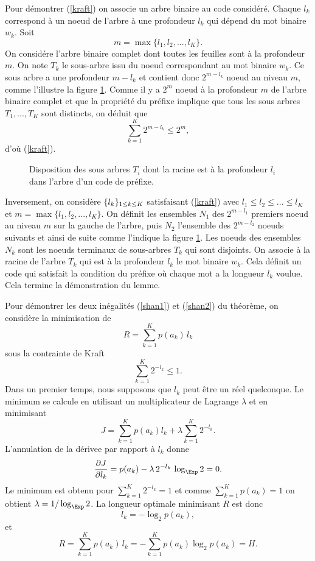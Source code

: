 Pour d\'emontrer (\ref{kraft}) on associe un arbre binaire
au code consid\'er\'e. Chaque $l_k$ correspond \`a un noeud
de l'arbre \`a une profondeur $l_k$ qui d\'epend du mot
binaire $w_k$. Soit
\begin{equation}
\label{mmax}
m = \max \{l_1, l_2, ... , l_K\} .
\end{equation}
On consid\'ere l'arbre binaire complet dont toutes les
feuilles sont \`a la profondeur $m$.
On note $T_k$ le sous-arbre issu du noeud correspondant au
mot binaire $w_k$. Ce sous arbre a une profondeur ${m - l_k}$
et contient donc $2^{m - l_k}$ noeud au niveau $m$, comme 
l'illustre la figure \ref{kraft-fig}. 
Comme il y a $2^m$ noeud \`a la profondeur $m$ de l'arbre binaire
complet et que
la propri\'et\'e du pr\'efixe implique
que tous les sous arbres $T_1 , ... , T_K$ sont distincts, on
d\'eduit que
\[
\sum_{k=1}^K 2^{m-l_k} \leq 2^m ,
\]
d'o\`u (\ref{kraft}).

\begin{figure}[bhtp]
\centerline{
	\epsfxsize=6cm
	\leavevmode{}}
\caption{Disposition des sous arbres $T_i$ dont la racine est \`a la
profondeur $l_i$ dans l'arbre d'un code de pr\'efixe.}
\label{kraft-fig}
\end{figure}


Inversement, on consid\`ere $\{ l_k \}_{ 1 \leq k \leq K}$ satisfaisant
(\ref{kraft}) avec $l_1 \leq l_2 \leq ... \leq l_K$ et 
$m = \max \{l_1, l_2, ... , l_K\}$. 
On d\'efinit les ensembles $N_1$ des $2^{m-l_1}$ premiers 
noeud au niveau $m$ sur la gauche de l'arbre, puis $N_2$
l'ensemble des $2^{m-l_2}$ noeuds suivants et ainsi de suite 
comme l'indique la figure \ref{kraft-fig}. 
Les noeuds des ensembles $N_k$ sont les noeuds terminaux
de sous-arbres $T_k$ qui sont disjoints. On associe
\`a la racine de l'arbre $T_k$ qui est \`a la profondeur
$l_k$ le mot binaire $w_k$. Cela d\'efinit un code
qui satisfait la condition du pr\'efixe o\`u chaque
mot a la longueur $l_k$ voulue.
Cela termine la d\'emonstration du lemme.

Pour d\'emontrer les deux in\'egalit\'es (\ref{shan1}) et 
(\ref{shan2}) du 
th\'eor\`eme, on consid\`ere la minimisation de
\[
R = \sum_{k=1}^K p(a_k) \,l_k
\]
sous la contrainte de Kraft
\[
\sum_{k=1}^K 2^{-l_k} \leq 1 .
\]
Dans un premier temps, nous 
supposons que $l_k$ peut \^etre un r\'eel quelconque.
Le minimum se calcule en utilisant un multiplicateur de
Lagrange $\lambda$ et en minimisant
\[
J = \sum_{k=1}^K p(a_k) l_k + \lambda \sum_{k=1}^K 2^{-l_k} .
\]
L'annulation de la d\'erivee par rapport \`a $l_k$ donne
\[
\frac {\partial J} {\partial l_k} = p(a_k) - \lambda \,2^{-l_k}\,
\log_\Exp 2  = 0 .
\]
Le minimum est obtenu pour $\sum_{k=1}^K 2^{-l_k} = 1$
et comme $\sum_{k=1}^K p(a_k) = 1$ on obtient
$\lambda = 1/\log_\Exp 2$. La longueur optimale minimisant 
$R$ est donc
\[
l_k = -\log_2 p(a_k) ,
\]
et
\[
R = 
\sum_{k=1}^K p(a_k)\, l_k = - \sum_{k=1}^K p(a_k) \log_2 p(a_k) = H .
\]

